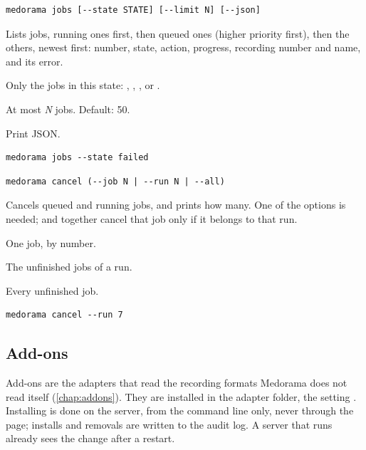 \begin{lstlisting}[style=signature]
medorama jobs [--state STATE] [--limit N] [--json]
\end{lstlisting}
Lists jobs, running ones first, then queued ones (higher priority first), then the others, newest
first: number, state, action, progress, recording number and name, and its error.
\begin{params}
\item[--state STATE] Only the jobs in this state: , , ,
   or .
\item[--limit N] At most \textit{N} jobs. Default: 50.
\item[--json] Print JSON.
\end{params}
\begin{lstlisting}[style=shell]
medorama jobs --state failed
\end{lstlisting}

\begin{lstlisting}[style=signature]
medorama cancel (--job N | --run N | --all)
\end{lstlisting}
Cancels queued and running jobs, and prints how many. One of the options is needed; 
and  together cancel that job only if it belongs to that run.
\begin{params}
\item[--job N] One job, by number.
\item[--run N] The unfinished jobs of a run.
\item[--all] Every unfinished job.
\end{params}
\begin{lstlisting}[style=shell]
medorama cancel --run 7
\end{lstlisting}

\subsection{Add-ons}
\label{sec:cli-addons}

Add-ons are the adapters that read the recording formats Medorama does not read itself
(\cref{chap:addons}). They are installed in the adapter folder, the setting .
Installing is done on the server, from the command line only, never through the page; installs
and removals are written to the audit log. A server that runs already sees the change after a
restart.

